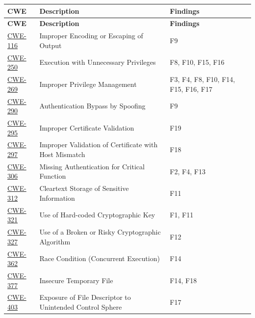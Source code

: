 \documentclass[11pt,a4paper]{article}
\begin{document}
\begin{longtable}{@{}lL{8cm}L{4cm}@{}}
  \toprule
  \textbf{CWE} & \textbf{Description} & \textbf{Findings} \\
  \midrule \endfirsthead
  \toprule
  \textbf{CWE} & \textbf{Description} & \textbf{Findings} \\
  \midrule \endhead
  \bottomrule \endlastfoot
  \href{https://cwe.mitre.org/data/definitions/116.html}{CWE-116}
    & Improper Encoding or Escaping of Output & F9 \\[0.3em]
  \href{https://cwe.mitre.org/data/definitions/250.html}{CWE-250}
    & Execution with Unnecessary Privileges & F8, F10, F15, F16 \\[0.3em]
  \href{https://cwe.mitre.org/data/definitions/269.html}{CWE-269}
    & Improper Privilege Management & F3, F4, F8, F10, F14, F15, F16, F17 \\[0.3em]
  \href{https://cwe.mitre.org/data/definitions/290.html}{CWE-290}
    & Authentication Bypass by Spoofing & F9 \\[0.3em]
  \href{https://cwe.mitre.org/data/definitions/295.html}{CWE-295}
    & Improper Certificate Validation & F19 \\[0.3em]
  \href{https://cwe.mitre.org/data/definitions/297.html}{CWE-297}
    & Improper Validation of Certificate with Host Mismatch & F18 \\[0.3em]
  \href{https://cwe.mitre.org/data/definitions/306.html}{CWE-306}
    & Missing Authentication for Critical Function & F2, F4, F13 \\[0.3em]
  \href{https://cwe.mitre.org/data/definitions/312.html}{CWE-312}
    & Cleartext Storage of Sensitive Information & F11 \\[0.3em]
  \href{https://cwe.mitre.org/data/definitions/321.html}{CWE-321}
    & Use of Hard-coded Cryptographic Key & F1, F11 \\[0.3em]
  \href{https://cwe.mitre.org/data/definitions/327.html}{CWE-327}
    & Use of a Broken or Risky Cryptographic Algorithm & F12 \\[0.3em]
  \href{https://cwe.mitre.org/data/definitions/362.html}{CWE-362}
    & Race Condition (Concurrent Execution) & F14 \\[0.3em]
  \href{https://cwe.mitre.org/data/definitions/377.html}{CWE-377}
    & Insecure Temporary File & F14, F18 \\[0.3em]
  \href{https://cwe.mitre.org/data/definitions/403.html}{CWE-403}
    & Exposure of File Descriptor to Unintended Control Sphere & F17 \\[0.3em]

\end{longtable}
\end{document}
